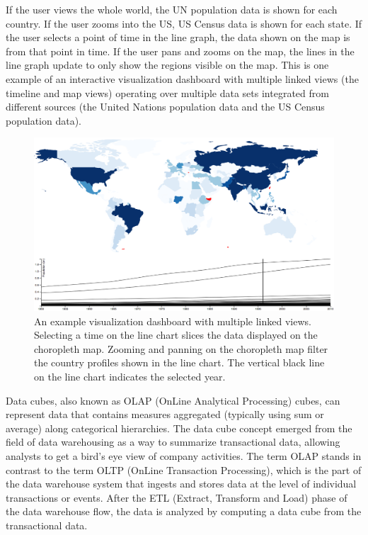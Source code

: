 If the user views the whole world, the UN population data is shown for each country. If the user zooms into the US, US Census data is shown for each state. If the user selects a point of time in the line graph, the data shown on the map is from that point in time. If the user pans and zooms on the map, the lines in the line graph update to only show the regions visible on the map. This is one example of an interactive visualization dashboard with multiple linked views (the timeline and map views) operating over multiple data sets integrated from different sources (the United Nations population data and the US Census population data).

\begin{figure}[h]
  \caption{An example visualization dashboard with multiple linked views. Selecting a time on the line chart slices the data displayed on the choropleth map. Zooming and panning on the choropleth map filter the country profiles shown in the line chart. The vertical black line on the line chart indicates the selected year.}
  \centering
  \includegraphics[width=\textwidth]{figures/linkedChoropleth.png}
\end{figure}


Data cubes, also known as OLAP (OnLine Analytical Processing) cubes, can represent data that contains measures aggregated (typically using sum or average) along categorical hierarchies. The data cube concept emerged from the field of data warehousing as a way to summarize transactional data, allowing analysts to get a bird's eye view of company activities. The term OLAP stands in contrast to the term OLTP (OnLine Transaction Processing), which is the part of the data warehouse system that ingests and stores data at the level of individual transactions or events. After the ETL (Extract, Transform and Load) phase of the data warehouse flow, the data is analyzed by computing a data cube from the transactional data.

